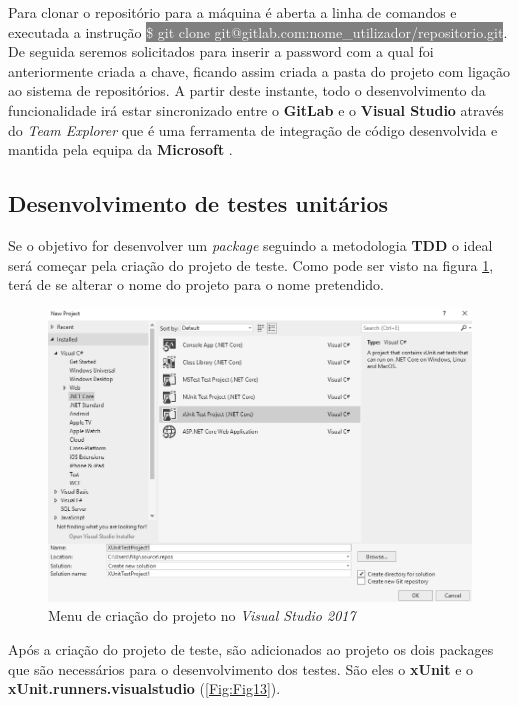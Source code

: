 \hspace{1cm}Para clonar o repositório para a máquina é aberta a linha de comandos e executada a instrução \colorbox{gray}{\textcolor{white}{\$ git clone git@gitlab.com:nome\_utilizador/repositorio.git}}. De seguida seremos solicitados para inserir a password com a qual foi anteriormente criada a chave, ficando assim criada a pasta do projeto com ligação ao sistema de repositórios. A partir deste instante, todo o desenvolvimento da funcionalidade irá estar sincronizado entre o \textbf{GitLab} e o \textbf{Visual Studio} através do \textit{Team Explorer} que é uma ferramenta de integração de código desenvolvida e mantida pela equipa da \textbf{Microsoft} \cite{gitclone}.

\subsection{Desenvolvimento de testes unitários}

\hspace{1cm}Se o objetivo for desenvolver um \textit{package} seguindo a metodologia \textbf{TDD} o ideal será começar pela criação do projeto de teste. Como pode ser visto na figura \ref{Fig:Fig12}, terá de se alterar o nome do projeto para o nome pretendido.

\begin{figure}[hbt!]
\centering
\includegraphics[width=0.7\linewidth]{Cap5/TestProjectCreation.png}
\caption{Menu de criação do projeto no \textit{Visual Studio 2017}}
\label{Fig:Fig12}
\end{figure}

\hspace{1cm}Após a criação do projeto de teste, são adicionados ao projeto os dois packages que são necessários para o desenvolvimento dos testes. São eles o \textbf{xUnit} e o \textbf{xUnit.runners.visualstudio} (\ref{Fig:Fig13}). 

